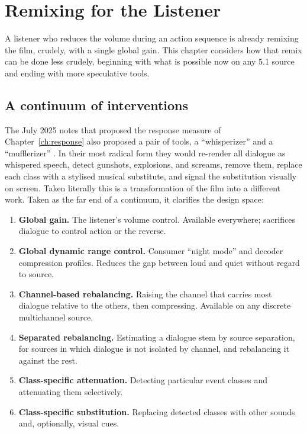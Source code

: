 \chapter{Remixing for the Listener}
\label{ch:intervention}

A listener who reduces the volume during an action sequence is already remixing the film, crudely, with a single global gain. This chapter considers how that remix can be done less crudely, beginning with what is possible now on any 5.1 source and ending with more speculative tools.

\section{A continuum of interventions}

The July 2025 notes that proposed the response measure of Chapter~\ref{ch:response} also proposed a pair of tools, a ``whisperizer'' and a ``mufflerizer'' \citep{flyxion2025}. In their most radical form they would re-render all dialogue as whispered speech, detect gunshots, explosions, and screams, remove them, replace each class with a stylised musical substitute, and signal the substitution visually on screen. Taken literally this is a transformation of the film into a different work. Taken as the far end of a continuum, it clarifies the design space:

\begin{enumerate}
\item \textbf{Global gain.} The listener's volume control. Available everywhere; sacrifices dialogue to control action or the reverse.
\item \textbf{Global dynamic range control.} Consumer ``night mode'' and decoder compression profiles. Reduces the gap between loud and quiet without regard to source.
\item \textbf{Channel-based rebalancing.} Raising the channel that carries most dialogue relative to the others, then compressing. Available on any discrete multichannel source.
\item \textbf{Separated rebalancing.} Estimating a dialogue stem by source separation, for sources in which dialogue is not isolated by channel, and rebalancing it against the rest.
\item \textbf{Class-specific attenuation.} Detecting particular event classes and attenuating them selectively.
\item \textbf{Class-specific substitution.} Replacing detected classes with other sounds and, optionally, visual cues.
\end{enumerate}

